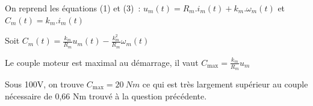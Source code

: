 \begin{texteCache}

  On reprend les équations (1) et (3)~:
  \(u_{m}\left( t \right) = R_{m}.i_{m}\left( t \right) + k_{m}.\omega_{m}\left( t \right)\)
  et \(C_{m}\left( t \right) = k_{m}.i_{m}\left( t \right)\)

  Soit
  \(C_{m}\left( t \right) = \frac{k_{m}}{R_{m}}u_{m}\left( t \right) - \frac{k_{m}^2}{R_{m}}\omega_{m}\left( t \right)\)

  Le couple moteur est maximal au démarrage, il vaut
  \(C_{\max} = \frac{k_{m}}{R_{m}}u_{m}\)

  Sous 100V, on trouve \(C_{\max} = 20\ Nm\) ce qui est très largement
  supérieur au couple nécessaire de 0,66 Nm trouvé à la question précédente.
  
  \vspace{3cm}

\end{texteCache}

